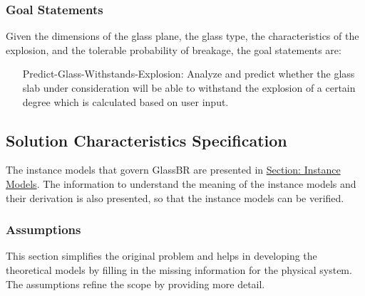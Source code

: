 \documentclass[12pt]{article}
\begin{document}
\subsubsection{Goal Statements}
\label{Sec:GoalStmt}
Given the dimensions of the glass plane, the glass type, the characteristics of the explosion, and the tolerable probability of breakage, the goal statements are:

\begin{itemize}
\item[Predict-Glass-Withstands-Explosion:\phantomsection\label{willBreakGS}]{Analyze and predict whether the glass slab under consideration will be able to withstand the explosion of a certain degree which is calculated based on user input.}
\end{itemize}
\subsection{Solution Characteristics Specification}
\label{Sec:SolCharSpec}
The instance models that govern GlassBR are presented in \hyperref[Sec:IMs]{Section: Instance Models}. The information to understand the meaning of the instance models and their derivation is also presented, so that the instance models can be verified.

\subsubsection{Assumptions}
\label{Sec:Assumps}
This section simplifies the original problem and helps in developing the theoretical models by filling in the missing information for the physical system. The assumptions refine the scope by providing more detail.
\end{document}
